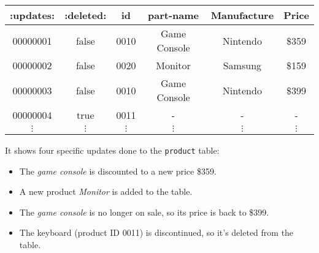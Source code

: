 \begin{example}
    \vspace{1em}
    \begin{center}
        \small
        \begin{tabular}{|c|c|c|c|c|c|} \hline
            :updates: & :deleted: & id & part-name & Manufacture & Price \\ \hline
            00000001 & false & 0010 & Game Console & Nintendo & \$359 \\ \hline
            00000002 & false & 0020 & Monitor & Samsung & \$159 \\ \hline
            00000003 & false & 0010 & Game Console & Nintendo & \$399 \\ \hline
            00000004 & true & 0011 & - & - & - \\ \hline
            $\vdots$ & $\vdots$ & $\vdots$ & $\vdots$ & $\vdots$ &  $\vdots$ \\ \hline
        \end{tabular}
    \end{center}
    \vspace{1em}

    It shows four specific updates done to the {\tt product} table:

    \begin{itemize}
        \item The {\em game console} is discounted to a new price \$359.
        \item A new product {\em Monitor} is added to the table.
        \item The {\em game console} is no longer on sale, so its price is back
            to \$399.
        \item The keyboard (product ID 0011) is discontinued, so it's deleted
            from the table.
    \end{itemize}

\end{example}


